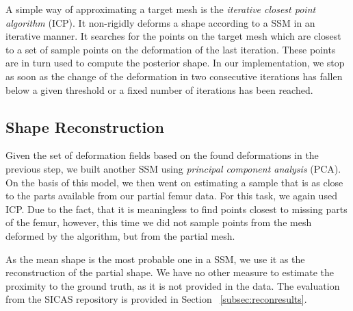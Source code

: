 A simple way of approximating a target mesh is the \emph{iterative closest point algorithm} (ICP).
It non-rigidly deforms a shape according to a SSM in an iterative manner.
It searches for the points on the target mesh which are closest to a set of sample points on the deformation of the last iteration.
These points are in turn used to compute the posterior  shape.
In our implementation, we stop as soon as the change of the deformation in two consecutive iterations has fallen below a given threshold or a fixed number of iterations has been reached.

\todoMissing{}


\subsection{Shape Reconstruction}
\label{subsec:recon}

Given the set of deformation fields based on the found deformations in the previous step, we built another SSM using \emph{principal component analysis} (PCA).
On the basis of this model, we then went on estimating a sample that is as close to the parts available from our partial femur data.
For this task, we again used ICP.
Due to the fact, that it is meaningless to find points closest to missing parts of the femur, however, this time we did not sample points from the mesh deformed by the algorithm, but from the partial mesh.

As the mean shape is the most probable one in a SSM, we use it as the reconstruction of the partial shape.
We have no other measure to estimate the proximity to the ground truth, as it is not provided in the data.
The evaluation from the SICAS repository is provided in Section ~\ref{subsec:reconresults}.

